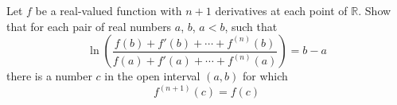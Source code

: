 Let $f$ be a real-valued function with $n+1$ derivatives at each point of $\mathbb R$. Show that for each pair of real numbers $a$, $b$, $a<b$, such that
$$\ln\left( \frac{f(b)+f'(b)+\cdots + f^{(n)} (b)}{f(a)+f'(a)+\cdots + f^{(n)}(a)}\right)=b-a$$there is a number $c$ in the open interval $(a,b)$ for which
$$f^{(n+1)}(c)=f(c)$$